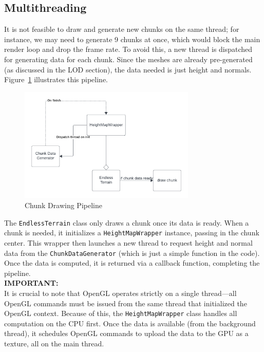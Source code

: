 \subsection{Multithreading}
It is not feasible to draw and generate new chunks on the same thread; for instance, we may need to generate 9 chunks at once, which would block the main render loop and drop the frame rate. To avoid this, a new thread is dispatched for generating data for each chunk. Since the meshes are already pre-generated (as discussed in the LOD section), the data needed is just height and normals.
Figure~\ref{fig:chunk_pipeline} illustrates this pipeline.

\begin{figure}[H]
    \centering
    \includegraphics[width=0.75\textwidth]{images/chunk_process.png}
    \caption{Chunk Drawing Pipeline}
    \label{fig:chunk_pipeline}
\end{figure}

The \texttt{EndlessTerrain} class only draws a chunk once its data is ready. When a chunk is needed, it initializes a \texttt{HeightMapWrapper} instance, passing in the chunk center. This wrapper then launches a new thread to request height and normal data from the \texttt{ChunkDataGenerator} (which is just a simple function in the code). Once the data is computed, it is returned via a callback function, completing the pipeline.
\\
\textbf{\large IMPORTANT:}\\
It is crucial to note that OpenGL operates strictly on a single thread—all OpenGL commands must be issued from the same thread that initialized the OpenGL context. Because of this, the \texttt{HeightMapWrapper} class handles all computation on the CPU first. Once the data is available (from the background thread), it schedules OpenGL commands to upload the data to the GPU as a texture, all on the main thread.

